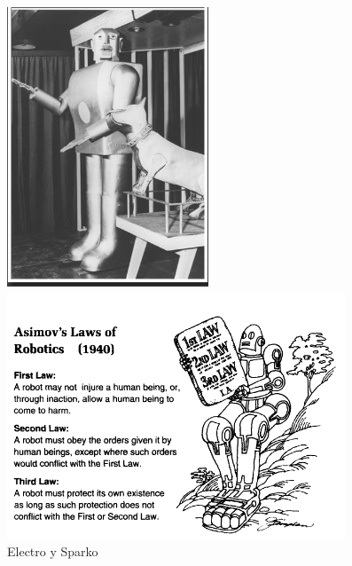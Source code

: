 \begin{figure}[ht!]
	\centering
	\begin{minipage}{0.3\linewidth}
		\centering
		\includegraphics[width=\linewidth]{figs/electro-sparko.png}
		\caption*{\centering Electro y Sparko \cite{bidaudrobots}}
	\end{minipage}
	\hspace{3cm}
	\begin{minipage}{0.3\linewidth}
		\centering
		\includegraphics[width=\linewidth]{figs/issac-law.png}

\end{minipage}
\end{figure}
